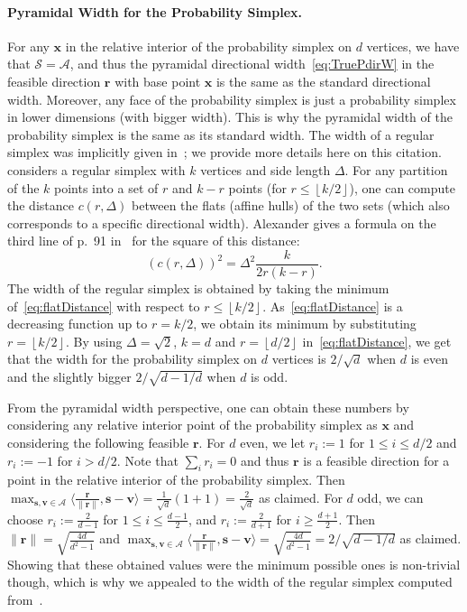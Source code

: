 \documentclass{article} %
\newcommand{\x}{\bm{x}}
\newcommand{\s}{\bm{s}}
\newcommand{\vv}{\bm{v}} %
\newcommand{\Vertices}{\mathcal{A}} %
\renewcommand{\S}{\mathcal{S}}
\renewcommand{\r}{\bm{r}}
\newcommand{\innerProdCompressed}[2]{\langle #1 , #2 \rangle}
\newcommand{\0}{\mathbf{0}} %
\begin{document}
\paragraph{Pyramidal Width for the Probability Simplex.} For any $\x$ in the relative
interior of the probability simplex on $d$ vertices, we have that $\S = \Vertices$,
and thus the pyramidal directional width~\eqref{eq:TruePdirW} in the feasible direction $\r$
with base point $\x$ is the same as the standard directional width.
Moreover, any face of the probability simplex is just a probability simplex in lower
dimensions (with bigger width). This is why the pyramidal width of the
probability simplex is the same as its standard width. The width of a regular simplex
was implicitly given in~\citep{Alexander:1977:simplex}; we provide more
details here on this citation. \citet{Alexander:1977:simplex} considers a regular
simplex with $k$ vertices and side length $\Delta$. For any partition of the $k$ points
into a set of $r$ and $k-r$ points (for $r \leq \left\lfloor{k/2}\right \rfloor$),
one can compute the distance $c(r,\Delta)$ between the flats (affine hulls) of the two
sets (which also corresponds to a specific directional width). 
Alexander gives a formula on the third line of p.~91 
in~\citep{Alexander:1977:simplex} for the square of this distance:
\begin{equation} \label{eq:flatDistance}
\left( c(r,\Delta) \right)^2 = \Delta^2 \frac{k}{2r (k-r)} . 
\end{equation}
The width of the regular simplex is obtained by taking the minimum of~\eqref{eq:flatDistance} with
respect to $r  \leq \left\lfloor{k/2}\right \rfloor$. As~\eqref{eq:flatDistance} is
a decreasing function up to $r = k/2$, we obtain its minimum 
by substituting $r = \left\lfloor{k/2}\right \rfloor$. By using $\Delta = \sqrt{2}$, $k=d$
and $r = \left\lfloor{d/2}\right \rfloor$ in~\eqref{eq:flatDistance},
we get that the width for the probability simplex on $d$ vertices is $2/\sqrt{d}$ when
$d$ is even and the slightly bigger $2/\sqrt{d - 1/d}$ when $d$ is odd.

From the pyramidal width perspective, one can obtain these numbers by 
considering any relative interior point of the probability simplex as $\x$
and considering the following feasible $\r$. For $d$ even,
we let $r_i := 1$ for $1 \leq i \leq d/2$ and $r_i := -1$ for $i > d/2$.
Note that $\sum_i r_i = 0$ and thus $\r$ is a feasible direction
for a point in the relative interior of the probability simplex.
Then $\max_{\s, \vv \in \Vertices} \innerProdCompressed{\frac{\r}{\| \r\|}}{\s - \vv} = \frac{1}{\sqrt{d}} (1+1) = \frac{2}{\sqrt{d}}$ as claimed. For $d$ odd, we can choose
$r_i := \frac{2}{d-1}$ for $1 \leq i \leq \frac{d-1}{2}$, and $r_i := \frac{2}{d+1}$
for $i \geq \frac{d+1}{2}$. Then $\| \r \| = \sqrt{\frac{4d}{d^2 -1}}$ and
$\max_{\s, \vv \in \Vertices} \innerProdCompressed{\frac{\r}{\| \r\|}}{\s - \vv} = \sqrt{\frac{4d}{d^2-1}}
= 2/\sqrt{d - 1/d}$ as claimed. Showing that these obtained values
were the minimum possible ones is non-trivial though, which is
why we appealed to the width of the regular simplex computed 
from~\citep{Alexander:1977:simplex}.
\end{document}
